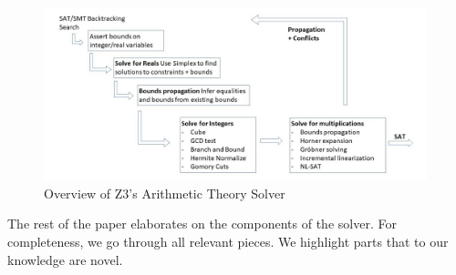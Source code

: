 \begin{figure}[htbp]
  \centering
  \includegraphics[width=0.99\textwidth]{figures/Arithmetic.jpg}
  \caption{Overview of Z3's Arithmetic Theory Solver }
  \label{fig:organization}
\end{figure}

The rest of the paper elaborates on the components of the solver. For completeness, we
go through all relevant pieces. We highlight parts that to our knowledge are novel.


